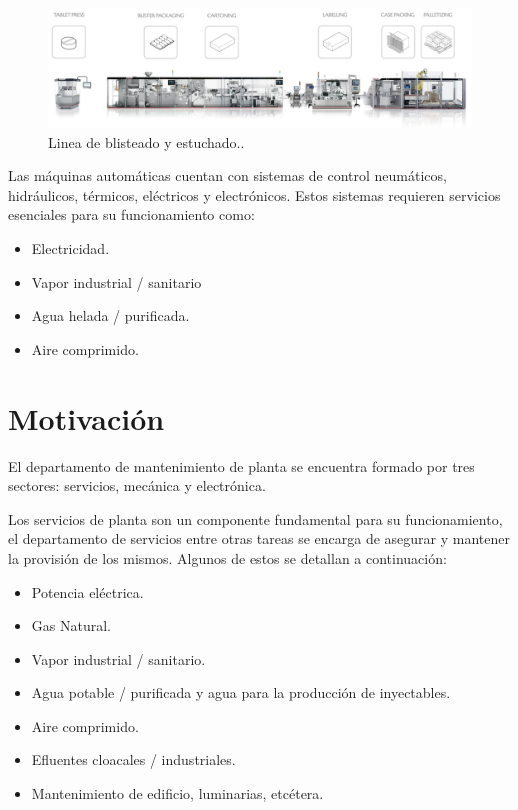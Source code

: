\begin{figure}[htbp]
	\centering
	\includegraphics[width=1\textwidth]{./Figures/IMA.png}
	\caption{Linea de blisteado y estuchado.\protect\footnotemark.}
	\label{fig:LINEA}
\end{figure}


Las máquinas automáticas cuentan con sistemas de control neumáticos, hidráulicos, térmicos, eléctricos y electrónicos. Estos sistemas requieren servicios esenciales para su funcionamiento como:
 
\begin{itemize}
	\item Electricidad.
	\item Vapor industrial / sanitario
	\item Agua helada / purificada.
	\item Aire comprimido.
\end{itemize}


\section{Motivación}

El departamento de mantenimiento de planta se encuentra formado por tres sectores: servicios, mecánica y electrónica.


Los servicios de planta son un componente fundamental para su funcionamiento, el departamento de servicios entre otras tareas se encarga de asegurar y mantener la provisión de los mismos. Algunos de estos se detallan a continuación:

\begin{itemize}
	\item Potencia eléctrica.
	\item Gas Natural.
	\item Vapor industrial / sanitario.
	\item Agua potable / purificada y agua para la producción de inyectables.
	\item Aire comprimido.
	\item Efluentes cloacales / industriales.
	\item Mantenimiento de edificio, luminarias, etcétera.
\end{itemize}

